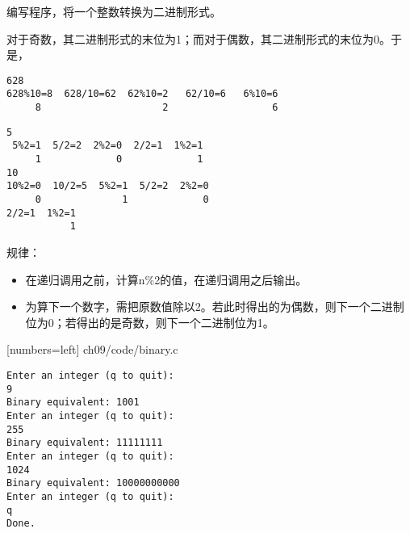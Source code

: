 \begin{frame}[fragile]
编写程序，将一个整数转换为二进制形式。
\end{frame}

\begin{frame}[fragile]
对于奇数，其二进制形式的末位为1；而对于偶数，其二进制形式的末位为0。于是，
\begin{lstlisting}[backgroundcolor=\color{red!10}]
628
628%10=8  628/10=62  62%10=2   62/10=6   6%10=6
     8                     2                  6
\end{lstlisting}

\begin{lstlisting}[backgroundcolor=\color{red!10}]
5  
 5%2=1  5/2=2  2%2=0  2/2=1  1%2=1
     1             0             1 
10
10%2=0  10/2=5  5%2=1  5/2=2  2%2=0  
     0              1             0
2/2=1  1%2=1
           1
\end{lstlisting}

\end{frame}

\begin{frame}[fragile]
规律：
\vspace{0.1in}

\begin{itemize}
\item 
在递归调用之前，计算{\tf n\%2}的值，在递归调用之后输出。\\[0.1in]
\item
为算下一个数字，需把原数值除以2。若此时得出的为偶数，则下一个二进制位为0；若得出的是奇数，则下一个二进制位为1。
\end{itemize}
\end{frame}

\begin{frame}

  [numbers=left]
  {ch09/code/binary.c}
\end{frame}



\begin{frame}[fragile]
\begin{lstlisting}[backgroundcolor=\color{red!10}]
Enter an integer (q to quit):
9
Binary equivalent: 1001
Enter an integer (q to quit):
255
Binary equivalent: 11111111
Enter an integer (q to quit):
1024
Binary equivalent: 10000000000
Enter an integer (q to quit):
q
Done.
\end{lstlisting}
\end{frame}


